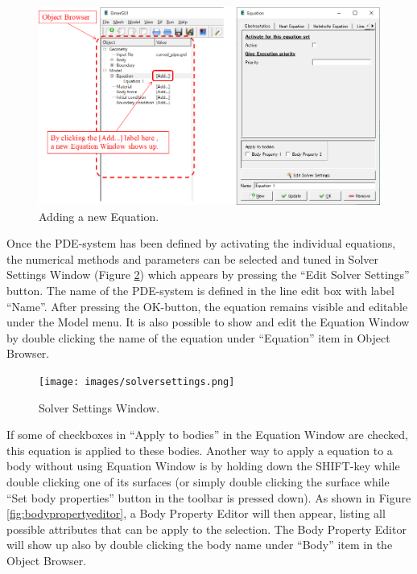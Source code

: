 \begin{figure}[htb]
\begin{center}
 \includegraphics[scale=0.5]{images/equation.png}
\caption{Adding a new Equation.}
\label{fig:equation}
\end{center}
\end{figure}

Once the PDE-system has been defined by activating the individual equations, the numerical
methods and parameters can be selected and tuned in Solver Settings Window (Figure \ref{fig:solversettings}) which appears by pressing the ``Edit Solver Settings'' button.
The name of the PDE-system is defined in the line edit box with label ``Name''. After pressing
the OK-button, the equation remains visible and editable under the Model menu. 
It is also possible to show and edit the Equation Window by double clicking the name of the equation under ``Equation'' item in Object Browser.

\begin{figure}[htb]
\begin{center}
 \texttt{[image: images/solversettings.png]}
\caption{Solver Settings Window.}
\label{fig:solversettings}
\end{center}
\end{figure}

If some of checkboxes in ``Apply to bodies'' in the Equation Window are checked, this equation is applied to these bodies. 
Another way to apply a equation to a body without using Equation Window is by holding down the SHIFT-key while double clicking one of its surfaces (or simply double clicking the surface while ``Set body properties'' button in the toolbar is pressed down).
As shown in Figure \ref{fig:bodypropertyeditor}, a Body Property Editor will then appear,
listing all possible attributes that can be apply to the selection. The Body Property Editor will show up also by double clicking the body name under ``Body'' item in the Object Browser. 


